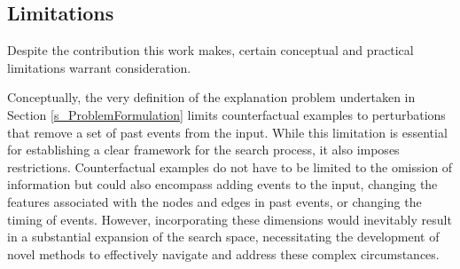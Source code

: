 

\subsection{Limitations}
\label{s_Conclusion_Limitations}

Despite the contribution this work makes, certain conceptual and practical limitations warrant consideration.

Conceptually, the very definition of the explanation problem undertaken in Section \ref{s_ProblemFormulation} limits counterfactual examples to perturbations that remove a set of past events from the input. While this limitation is essential for establishing a clear framework for the search process, it also imposes restrictions. Counterfactual examples do not have to be limited to the omission of information but could also encompass adding events to the input, changing the features associated with the nodes and edges in past events, or changing the timing of events. However, incorporating these dimensions would inevitably result in a substantial expansion of the search space, necessitating the development of novel methods to effectively navigate and address these complex circumstances.

